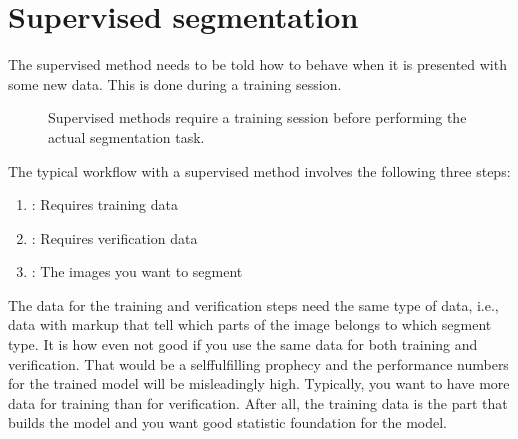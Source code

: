 \documentclass[letterpaper,10pt,english]{sphinxmanual}
\begin{document}
\begin{sphinxVerbatim}[commandchars=\\\{\}]
     
\end{sphinxVerbatim}


\chapter{Supervised segmentation}
\label{\detokenize{ML4NeutronImageSegmentation:supervised-segmentation}}
The supervised method needs to be told how to behave when it is presented with some new data. This is done during a training session.

\begin{figure}[htbp]
\centering
\capstart

\noindent{}
\caption{Supervised methods require a training session before performing the actual segmentation task.}\label{\detokenize{ML4NeutronImageSegmentation:id16}}\end{figure}



The typical workflow with a supervised method involves the following three steps:
\begin{enumerate}
%
\item {} 
: Requires training data

\item {} 
: Requires verification data

\item {} 
: The images you want to segment

\end{enumerate}

The data for the training and verification steps need the same type of data, i.e., data with markup that tell which parts of the image belongs to which segment type. It is how even not good if you use the same data for both training and verification. That would be a self\sphinxhyphen{}fulfilling prophecy and the performance numbers for the trained model will be misleadingly high. Typically, you want to have more data for training than for verification. After all, the training data is the part that builds the model and you want good statistic foundation for the model.
\end{document}
